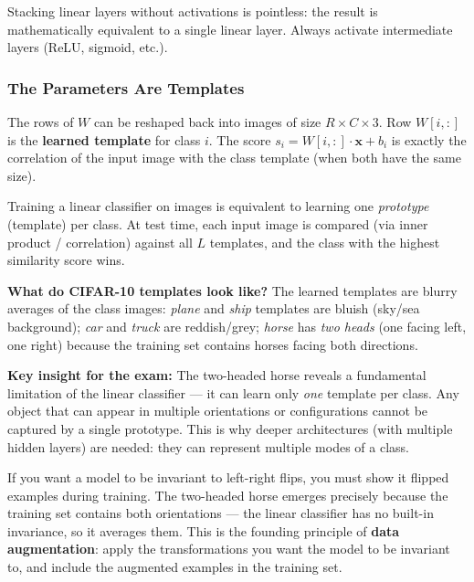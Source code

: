 \documentclass[11pt,a4paper]{article}
\begin{document}
\begin{warnbox}
Stacking linear layers without activations is pointless: the result is mathematically equivalent to a single
linear layer.  Always activate intermediate layers (ReLU, sigmoid, etc.).
\end{warnbox}

\subsubsection{The Parameters Are Templates}

The rows of $W$ can be reshaped back into images of size $R \times C \times 3$.  Row $W[i, :]$
is the \textbf{learned template} for class $i$.  The score $s_i = W[i,:]\cdot\mathbf{x} + b_i$ is
exactly the correlation of the input image with the class template (when both have the same size).

\begin{insightbox}
Training a linear classifier on images is equivalent to learning one \emph{prototype} (template) per class.
At test time, each input image is compared (via inner product / correlation) against all $L$ templates,
and the class with the highest similarity score wins.

\textbf{What do CIFAR-10 templates look like?}  The learned templates are blurry averages of the class
images: \emph{plane} and \emph{ship} templates are bluish (sky/sea background); \emph{car} and
\emph{truck} are reddish/grey; \emph{horse} has \emph{two heads} (one facing left, one right) because
the training set contains horses facing both directions.

\textbf{Key insight for the exam:} The two-headed horse reveals a fundamental limitation of the linear
classifier — it can learn only \emph{one} template per class.  Any object that can appear in multiple
orientations or configurations cannot be captured by a single prototype.  This is why deeper architectures
(with multiple hidden layers) are needed: they can represent multiple modes of a class.
\end{insightbox}

\begin{insightbox}
If you want a model to be invariant to left-right flips, you must show it flipped examples during training.
The two-headed horse emerges precisely because the training set contains both orientations — the linear
classifier has no built-in invariance, so it averages them.  This is the founding principle of
\textbf{data augmentation}: apply the transformations you want the model to be invariant to, and include
the augmented examples in the training set.
\end{insightbox}
\end{document}
